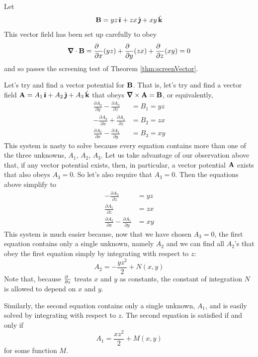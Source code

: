 \begin{eg}\label{eg:vectorPotential}
Let 
\begin{equation*}
\mathbf{B} = yz\,\hat{\pmb{\imath}} + zx\,\hat{\pmb{\jmath}} + xy\,\hat{\mathbf{k}}
\end{equation*}
This vector field has been set up carefully to obey
\begin{equation*}
\vnabla\cdot\vB = \frac{\partial\hfill}{\partial x}(yz)
                 +\frac{\partial\hfill}{\partial y}(zx)
                 +\frac{\partial\hfill}{\partial z}(xy)
                =0
\end{equation*}
and so passes the screening test of Theorem \ref{thm:screenVector}.

Let's try and find a vector potential for $\mathbf{B}$. That is, let's
try and find a vector field $\mathbf{A}= A_1\,\hat{\pmb{\imath}} + A_2\,\hat{\pmb{\jmath}} + A_3\,\hat{\mathbf{k}}$ 
that obeys $\vnabla\times\vA = \vB$,
or equivalently,
\begin{align*}
\frac{\partial A_3}{\partial y} -\frac{\partial A_2}{\partial z} &= B_1 =yz\\
-\frac{\partial A_3}{\partial x} +\frac{\partial A_1}{\partial z}&=B_2=zx \\
\frac{\partial A_2}{\partial x} -\frac{\partial A_1}{\partial y}&=B_3=xy
\end{align*}
This system is nasty to solve because every equation contains more than one
of the three unknowns, $A_1$, $A_2$, $A_3$.
Let us take advantage of our observation above that, 
if any vector potential exists, then, in particular,
a vector potential $\mathbf{A}$ exists that also obeys $A_3=0$. So let's also
require that $A_3=0$. Then the equations above simplify to
 \begin{align*}
 -\frac{\partial A_2}{\partial z} &=yz\\
  \frac{\partial A_1}{\partial z} &=zx \\
\frac{\partial A_2}{\partial x} -\frac{\partial A_1}{\partial y}&=xy
\end{align*}
This system is much easier because, now that we have chosen $A_3=0$, 
the first equation contains only a single unknown, namely $A_2$ and we 
can find all $A_2$'s that obey the first equation simply by integrating 
with respect to $z$:
\begin{equation*}
A_2 = -\frac{yz^2}{2} + N(x,y)
\end{equation*}
Note that, because $\frac{\partial\hfill}{\partial z}$ treats $x$ and $y$
as constants, the constant of integration $N$ is allowed to depend on $x$ 
and $y$. 

Similarly, the second equation contains only a single unknown,
$A_1$, and is easily solved by integrating with respect to $z$. 
The second equation is satisfied if and only if
\begin{equation*}
A_1 = \frac{xz^2}{2} + M(x,y)
\end{equation*}
for some function $M$. 


\end{eg}
